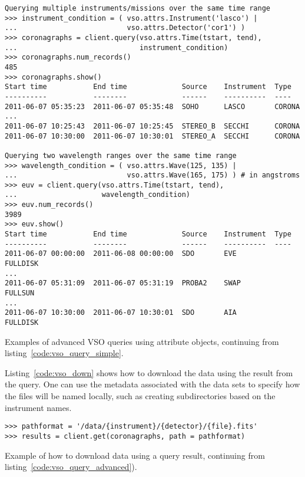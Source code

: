 \begin{listing}[h]
\begin{verbatim}
Querying multiple instruments/missions over the same time range
>>> instrument_condition = ( vso.attrs.Instrument('lasco') |
...                          vso.attrs.Detector('cor1') )
>>> coronagraphs = client.query(vso.attrs.Time(tstart, tend),
...                             instrument_condition)
>>> coronagraphs.num_records()
485
>>> coronagraphs.show()
Start time           End time             Source    Instrument  Type
----------           --------             ------    ----------  ----
2011-06-07 05:35:23  2011-06-07 05:35:48  SOHO      LASCO       CORONA
...
2011-06-07 10:25:43  2011-06-07 10:25:45  STEREO_B  SECCHI      CORONA
2011-06-07 10:30:00  2011-06-07 10:30:01  STEREO_A  SECCHI      CORONA

Querying two wavelength ranges over the same time range
>>> wavelength_condition = ( vso.attrs.Wave(125, 135) |
...                          vso.attrs.Wave(165, 175) ) # in angstroms
>>> euv = client.query(vso.attrs.Time(tstart, tend),
...                    wavelength_condition)
>>> euv.num_records()
3989
>>> euv.show()
Start time           End time             Source    Instrument  Type
----------           --------             ------    ----------  ----
2011-06-07 00:00:00  2011-06-08 00:00:00  SDO       EVE         FULLDISK
...
2011-06-07 05:31:09  2011-06-07 05:31:19  PROBA2    SWAP        FULLSUN
...
2011-06-07 10:30:00  2011-06-07 10:30:01  SDO       AIA         FULLDISK
\end{verbatim}
\caption{Examples of advanced VSO queries using attribute objects,
continuing from listing~\ref{code:vso_query_simple}.}
\label{code:vso_query_advanced}
\end{listing}

Listing~\ref{code:vso_down} shows how to download the data using the result
from the query.
One can use the metadata associated with the data sets to specify how the
files will be named locally, such as creating subdirectories based on the
instrument names.

\begin{listing}[h]
\begin{verbatim}
>>> pathformat = '/data/{instrument}/{detector}/{file}.fits'
>>> results = client.get(coronagraphs, path = pathformat)
\end{verbatim}
\caption{Example of how to download data using a query result, continuing from
listing~\ref{code:vso_query_advanced}).}
\label{code:vso_down}
\end{listing}
